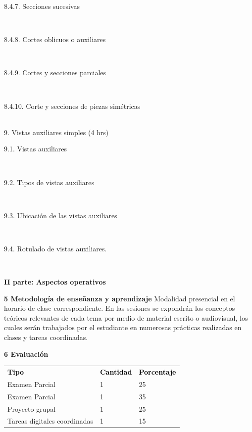 \documentclass[letterpaper]{article}%
\begin{document}
\hspace*{0.04\linewidth}\parbox{0.96\linewidth}{\strut 8.4.7. Secciones sucesivas\strut}\\
\hspace*{0.04\linewidth}\parbox{0.96\linewidth}{\strut 8.4.8. Cortes oblicuos o auxiliares\strut}\\
\hspace*{0.04\linewidth}\parbox{0.96\linewidth}{\strut 8.4.9. Cortes y secciones parciales\strut}\\
\hspace*{0.04\linewidth}\parbox{0.96\linewidth}{\strut 8.4.10. Corte y secciones de piezas simétricas\strut}\\
9. Vistas auxiliares simples (4 hrs)\\
\hspace*{0.02\linewidth}\parbox{0.98\linewidth}{\strut 9.1. Vistas auxiliares\strut}\\
\hspace*{0.02\linewidth}\parbox{0.98\linewidth}{\strut 9.2. Tipos de vistas auxiliares\strut}\\
\hspace*{0.02\linewidth}\parbox{0.98\linewidth}{\strut 9.3. Ubicación de las vistas auxiliares\strut}\\
\hspace*{0.02\linewidth}\parbox{0.98\linewidth}{\strut 9.4. Rotulado de vistas auxiliares.\strut}\\%
\newpage%
\par\fontsize{14}{0}\selectfont \textbf{\textcolor{parte}{II parte: Aspectos operativos}}%
\par\hspace*{0mm}\fontsize{12}{20}\selectfont \textbf{\textcolor{parte}{5 Metodología de enseñanza y aprendizaje}}%
\newline%
Modalidad presencial en el horario de clase correspondiente. En las sesiones se expondrán los conceptos teóricos relevantes de cada tema por medio de material escrito o audiovisual, los cuales serán trabajados por el estudiante en numerosas prácticas realizadas en clases y tareas coordinadas.%
\vspace*{5mm}%
\par\hspace*{0mm}\fontsize{12}{20}\selectfont \textbf{\textcolor{parte}{6 Evaluación}}%
\newline%
\vspace*{10mm}%
\begin{tabularx}{\textwidth}{>{\raggedright}m{}m{}m{}}%
\par\fontsize{12}{0}\selectfont \textbf{\textcolor{black}{Tipo}}&\par\fontsize{12}{0}\selectfont \textbf{\textcolor{black}{Cantidad}}&\par\fontsize{12}{0}\selectfont \textbf{\textcolor{black}{Porcentaje}}\\%
Examen Parcial&1&25
\\%
Examen Parcial&1&35
\\%
Proyecto grupal&1&25
\\%
Tareas digitales coordinadas&1&15\\%
\end{tabularx}%
\end{document}
